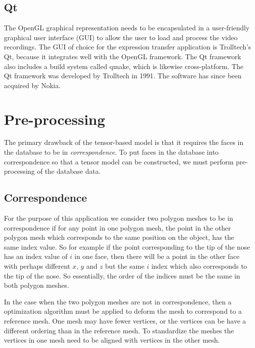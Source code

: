 \documentclass[11pt,a4paper,twoside]{report}
\begin{document}
\subsection{Qt}
The OpenGL graphical representation needs to be encapsulated in a user-friendly graphical user
interface (GUI) to allow the user to load and process the video recordings. The GUI
of choice for the expression transfer application is Trolltech's Qt, because it integrates well
with the OpenGL framework. The Qt framework also includes a build system called qmake, which is
likewise cross-platform. The Qt framework was developed by Trolltech in 1991. The
software has since been acquired by Nokia.  


\section{Pre-processing}
The primary drawback of the tensor-based model is that it requires the faces in
the database to be in \textit{correspondence}. To put faces in the database into correspondence
so that a tensor model can be constructed, we must perform pre-processing of the
database data.

\subsection{Correspondence}
For the purpose of this application we consider two polygon meshes to be in correspondence
if for any point in one polygon mesh, the point in the other polygon mesh which corresponds to the
same position on the object, has the same index value. So for example if the
point corresponding to the tip of the nose has an index value of $i$ in one
face, then  there will be a point in the other face with perhaps
different $x$, $y$ and $z$ but the same $i$ index which also corresponds to the
tip of the nose. So essentially, the order of the indices must be the same in both
polygon meshes. 

In the case when the two polygon meshes are not in correspondence, then a
optimization algorithm must be applied to deform the mesh to correspond to a
reference mesh. One mesh may have fewer vertices, or the vertices can be have a different
ordering than in the reference mesh. To standardize the meshes the vertices in
one mesh need to be aligned with vertices in the other mesh. 
\end{document}
